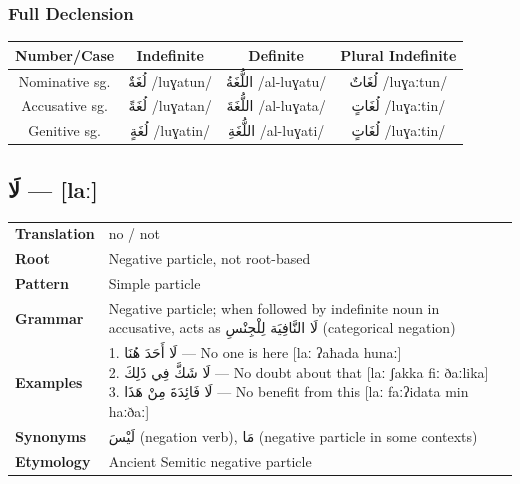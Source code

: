 \documentclass[letterpaper,12pt]{article}
\begin{document}
\subsubsection*{Full Declension}
\begin{tabular}{|c|c|c|c|}
\hline
\textbf{Number/Case} & \textbf{Indefinite} & \textbf{Definite} & \textbf{Plural Indefinite} \\
\hline
Nominative sg. & \textarabic{لُغَةٌ} /luɣatun/ & \textarabic{اللُّغَةُ} /al-luɣatu/ & \textarabic{لُغَاتٌ} /luɣaːtun/ \\
\hline
Accusative sg. & \textarabic{لُغَةً} /luɣatan/ & \textarabic{اللُّغَةَ} /al-luɣata/ & \textarabic{لُغَاتٍ} /luɣaːtin/ \\
\hline
Genitive sg. & \textarabic{لُغَةٍ} /luɣatin/ & \textarabic{اللُّغَةِ} /al-luɣati/ & \textarabic{لُغَاتٍ} /luɣaːtin/ \\
\hline
\end{tabular}

\subsection{\textarabic{لَا} — [laː]}
\begin{tabular}{p{3cm}p{10cm}}
\toprule
\textbf{Translation} & no / not \\
\textbf{Root} & Negative particle, not root-based \\
\textbf{Pattern} & Simple particle \\
\textbf{Grammar} & Negative particle; when followed by indefinite noun in accusative, acts as \textarabic{لَا النَّافِيَة لِلْجِنْسِ} (categorical negation) \\
\midrule
\textbf{Examples} & \makecell[l]{\parbox{9.5cm}{
1. \textarabic{لَا أَحَدَ هُنَا} — No one is here [laː ʔaħada hunaː]\\
2. \textarabic{لَا شَكَّ فِي ذَلِكَ} — No doubt about that [laː ʃakka fiː ðaːlika]\\
3. \textarabic{لَا فَائِدَةَ مِنْ هَذَا} — No benefit from this [laː faːʔidata min haːðaː]
}} \\
\midrule
\textbf{Synonyms} & \textarabic{لَيْسَ} (negation verb), \textarabic{مَا} (negative particle in some contexts) \\
\textbf{Etymology} & Ancient Semitic negative particle \\
\bottomrule
\end{tabular}
\end{document}
